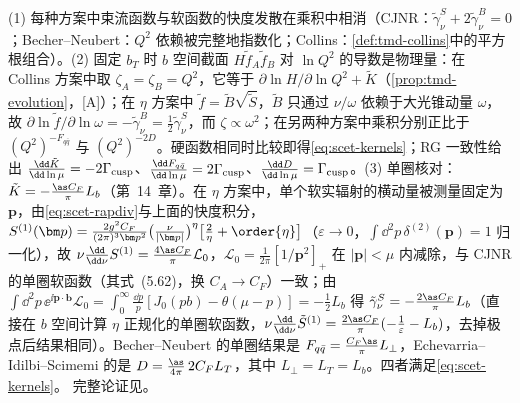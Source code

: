 \begin{proofsketch}
(1) 每种方案中束流函数与软函数的快度发散在乘积中相消（CJNR：$\tilde\gamma^S_\nu+2\tilde\gamma^B_\nu=0$\cite{ChiuEtAl2012b}；Becher--Neubert：$Q^2$ 依赖被完整地指数化\cite{BecherNeubert2011}；Collins：\cref{def:tmd-collins}中的平方根组合）。(2) 固定 $b_T$ 时 $b$ 空间截面 $H\tilde f_A\tilde f_B$ 对 $\ln Q^2$ 的导数是物理量：在 Collins 方案中取 $\zeta_A=\zeta_B=Q^2$，它等于 $\partial\ln H/\partial\ln Q^2+\tilde K$（\cref{prop:tmd-evolution}，[A]）；在 $\eta$ 方案中 $\tilde f=\tilde B\sqrt{\tilde S}$，$\tilde B$ 只通过 $\nu/\omega$ 依赖于大光锥动量 $\omega$，故 $\partial\ln\tilde f/\partial\ln\omega=-\tilde\gamma^B_\nu=\frac12\tilde\gamma^S_\nu$，而 $\zeta\propto\omega^2$；在另两种方案中乘积分别正比于 $(Q^2)^{-F_{q\bar q}}$ 与 $(Q^2)^{-2D}$。硬函数相同时比较即得\cref{eq:scet-kernels}；RG 一致性给出 $\frac{\dd\tilde K}{\dd\ln\mu}=-2\Gamma_{\rm cusp}$、$\frac{\dd F_{q\bar q}}{\dd\ln\mu}=2\Gamma_{\rm cusp}$\cite[式~(16)]{BecherNeubert2011}、$\frac{\dd D}{\dd\ln\mu}=\Gamma_{\rm cusp}$\cite[式~(5.14)]{EchevarriaIdilbiScimemi2012}。(3) 单圈核对：$\tilde K=-\frac{\as C_F}\pi L_b$（第~14~章）。在 $\eta$ 方案中，单个软实辐射的横动量被测量固定为 $\bm p$，由\cref{eq:scet-rapdiv}与上面的快度积分，$S^{(1)}(\bm p)=\frac{2g^2C_F}{(2\pi)^3\bm p^2}\big(\frac{\nu}{|\bm p|}\big)^{\eta}\big[\frac2\eta+\order{\eta}\big]$（$\varepsilon\to0$，$\int\dd^2p\,\delta^{(2)}(\bm p)=1$ 归一化），故 $\nu\frac{\dd}{\dd\nu}S^{(1)}=\frac{4\as C_F}{\pi}\mathcal L_0$，$\mathcal L_0=\frac1{2\pi}[1/\bm p^2]_+$ 在 $|\bm p|<\mu$ 内减除，与 CJNR 的单圈软函数（其式~(5.62)，换 $C_A\to C_F$）一致\cite{ChiuEtAl2012b}；由 $\int\dd^2p\,\ee^{\ii\bm p\cdot\bm b}\mathcal L_0=\int_0^\infty\frac{\dd p}p[J_0(pb)-\theta(\mu-p)]=-\frac12L_b$ 得 $\tilde\gamma^S_\nu=-\frac{2\as C_F}{\pi}L_b$（直接在 $b$ 空间计算 $\eta$ 正规化的单圈软函数，$\nu\frac{\dd}{\dd\nu}\tilde S^{(1)}=\frac{2\as C_F}{\pi}(-\frac1\varepsilon-L_b)$，去掉极点后结果相同）。Becher--Neubert 的单圈结果是 $F_{q\bar q}=\frac{C_F\as}\pi L_\perp$\cite[式~(40)]{BecherNeubert2011}，Echevarria--Idilbi--Scimemi 的是 $D=\frac{\as}{4\pi}\,2C_FL_T$\cite[式~(5.15)]{EchevarriaIdilbiScimemi2012}，其中 $L_\perp=L_T=L_b$。四者满足\cref{eq:scet-kernels}。%
完整论证见\cite{Collins:2017oxh,ChiuEtAl2012b,BecherNeubert2011,EchevarriaIdilbiScimemi2012}。
\end{proofsketch}

